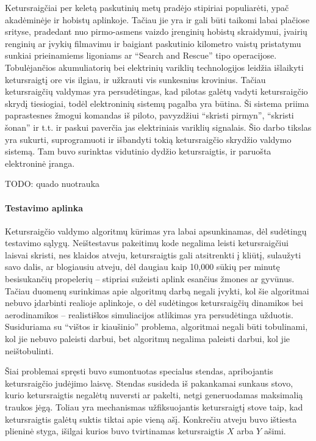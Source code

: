 \documentclass[12pt, a4paper, lithuanian, final]{article}
\begin{document}
\newpage
\tableofcontents



Ketursraigčiai per keletą paskutinių metų pradėjo stipiriai populiarėti, ypač akadėminėje ir hobistų aplinkoje.
Tačiau jie yra ir gali būti taikomi labai plačiose srityse, pradedant nuo pirmo-asmens vaizdo įrenginių hobistų skraidymui, įvairių renginių ar įvykių filmavimu ir baigiant paskutinio kilometro vaistų pristatymu sunkiai prieinamiems ligoniams ar
"`Search and Rescue"' tipo operacijose.
Tobulėjančios akumuliatorių bei elektrinių variklių technologijos leidžia išlaikyti ketursraigtį ore vis ilgiau, ir užkrauti vis sunkesnius krovinius.
Tačiau ketursraigčių valdymas yra persudėtingas, kad pilotas galėtų vadyti ketursraigčio skrydį tiesiogiai, todėl elektroninių sistemų pagalba yra būtina.
Ši sistema priima paprastesnes žmogui komandas iš piloto, pavyzdžiui "`skristi pirmyn"', "`skristi šonan"' ir t.t. ir paskui paverčia jas elektriniais variklių signalais.
Šio darbo tikslas yra sukurti, suprogramuoti ir išbandyti tokią ketursraigčio skrydžio valdymo sistemą.
Tam buvo surinktas vidutinio dydžio ketursraigtis, ir paruošta elektroninė įranga.

TODO: quado nuotrauka
\vspace{5cm}

\paragraph{Testavimo aplinka}

Ketursraigčio valdymo algoritmų kūrimas yra labai apsunkinamas, dėl sudėtingų testavimo sąlygų.
Neištestavus pakeitimų kode negalima leisti ketursraigčiui laisvai skristi, nes klaidos atveju, ketursraigtis gali atsitrenkti į kliūtį, sulaužyti savo dalis, ar blogiausiu atveju, dėl daugiau kaip 10,000 sūkių per minutę besisukančių propelerių -- stipriai sužeisti aplink esančius žmones ar gyvūnus.
Tačiau duomenų surinkimas apie algoritmų darbą negali įvykti, kol šie algoritmai nebuvo įdarbinti realioje aplinkoje, o dėl sudėtingos ketursraigčių dinamikos bei aerodinamikos -- realistiškos simuliacijos atlikimas yra persudėtinga užduotis.
Susiduriama su "`vištos ir kiaušinio"' problema, algoritmai negali būti tobulinami, kol jie nebuvo paleisti darbui, bet algoritmų negalima paleisti darbui, kol jie neištobulinti.

Šiai problemai spręsti buvo sumontuotas specialus stendas, apribojantis ketursraigčio judėjimo laisvę.
Stendas susideda iš pakankamai sunkaus stovo, kurio ketursraigtis negalėtų nuversti ar pakelti, netgi generuodamas maksimalią traukos jėgą.
Toliau yra mechanismas užfiksuojantis ketursraigtį stove taip, kad ketursraigtis galėtų suktis tiktai apie vieną ašį.
Konkrečiu atveju buvo ištiesta plieninė styga, išilgai kurios buvo tvirtinamas ketursraigtis $X$ arba $Y$ ašimi.
\end{document}
